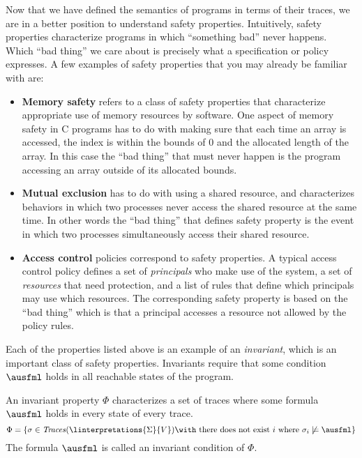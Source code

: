 \documentclass[11pt,twoside]{scrartcl}
\begin{document}
Now that we have defined the semantics of programs in terms of their traces, we are in a better position to understand safety properties. Intuitively, safety properties characterize programs in which ``something bad'' never happens. Which ``bad thing'' we care about is precisely what a specification or policy expresses. A few examples of safety properties that you may already be familiar with are:
\begin{itemize}
  \item \textbf{Memory safety} refers to a class of safety properties that characterize appropriate use of memory resources by software. One aspect of memory safety in C programs has to do with making sure that each time an array is accessed, the index is within the bounds of $0$ and the allocated length of the array. In this case the ``bad thing'' that must never happen is the program accessing an array outside of its allocated bounds.
  \item \textbf{Mutual exclusion} has to do with using a shared resource, and characterizes behaviors in which two processes never access the shared resource at the same time. In other words the ``bad thing'' that defines safety property is the event in which two processes simultaneously access their shared resource.
  \item \textbf{Access control} policies correspond to safety properties. A typical access control policy defines a set of \emph{principals} who make use of the system, a set of \emph{resources} that need protection, and a list of rules that define which principals may use which resources. The corresponding safety property is based on the ``bad thing'' which is that a principal accesses a resource not allowed by the policy rules.
\end{itemize}

Each of the properties listed above is an example of an \emph{invariant}, which is an important class of safety properties. Invariants require that some condition $\ausfml$ holds in all reachable states of the program.

\begin{definition}
\label{def:invariant}
An invariant property $\Phi$ characterizes a set of traces where some formula $\ausfml$ holds in every state of every trace.
\[
\Phi = \{\atrace \in \ttraces{\linterpretations{\Sigma}{V}} \with~\text{there does not exist}~i~\text{where}~\atrace_i \not\models \ausfml \}
\]
The formula $\ausfml$ is called an invariant condition of $\Phi$.
\end{definition}
\end{document}
